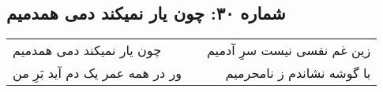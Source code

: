 \begin{center}
\section*{شماره ۳۰: چون یار نمیکند دمی همدمیم}
\label{sec:030}
\begin{longtable}{l p{0.5cm} r}
چون یار نمیکند دمی همدمیم
&&
زین غم نفسی نیست سرِ آدمیم
\\
ور در همه عمر یک دم آید بَرِ من
&&
با گوشه نشاندم ز نامحرمیم
\\
\end{longtable}
\end{center}
